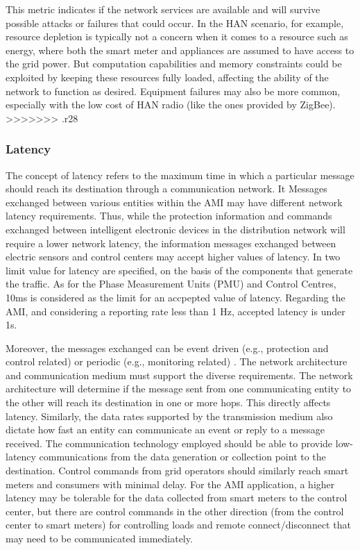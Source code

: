 \documentclass[11pt,draftclsnofoot,onecolumn]{IEEEtran}
\begin{document}
 This metric indicates if the network services are available and will survive possible attacks or failures that could occur. In the HAN scenario, for example, resource depletion is typically not a concern when it comes to a resource such as energy, where both the smart meter and appliances are assumed to have access to the grid power. But computation capabilities and memory constraints could be exploited by keeping these resources fully loaded, affecting the ability of the network to function as desired. Equipment failures may also be more common, especially with the low cost of HAN radio (like the ones provided by ZigBee).
>>>>>>> .r28

\subsubsection{Latency}
The concept of latency refers to the maximum time in which a particular message should reach its destination through a communication network. It Messages exchanged between various entities within the AMI may have different network latency requirements. Thus, while the protection information and commands exchanged between intelligent electronic devices in the distribution network will require a lower network latency, the information messages exchanged between electric sensors and control centers may accept higher values of latency.   In \cite{Xu2011} two limit value for latency are specified, on the basis of the components that generate the traffic. As for the Phase Measurement Units (PMU) and Control Centres, 10ms is considered as the limit for an accpepted value of latency.  Regarding the AMI, and considering a reporting rate less than 1 Hz, accepted latency is under 1s.

Moreover, the messages exchanged can be event driven (e.g., protection and control related) or periodic (e.g., monitoring related) \cite{Winter2012}. The network architecture and communication medium must support the diverse requirements. The network architecture will determine if the message sent from one communicating entity to the other will reach its destination in one or more hops. This directly affects latency. Similarly, the data rates supported by the transmission medium also dictate how fast an entity can communicate an event or reply to a message received.  The communication technology employed should be able to provide low-latency communications from the data generation or collection point to the destination. Control commands from grid operators should similarly reach smart meters and consumers with minimal delay. For the AMI application, a higher latency may be tolerable for the data collected from smart meters to the control center, but there are control commands in the other direction (from the control center to smart meters) for controlling loads and remote connect/disconnect that may need to be communicated immediately.
\end{document}
